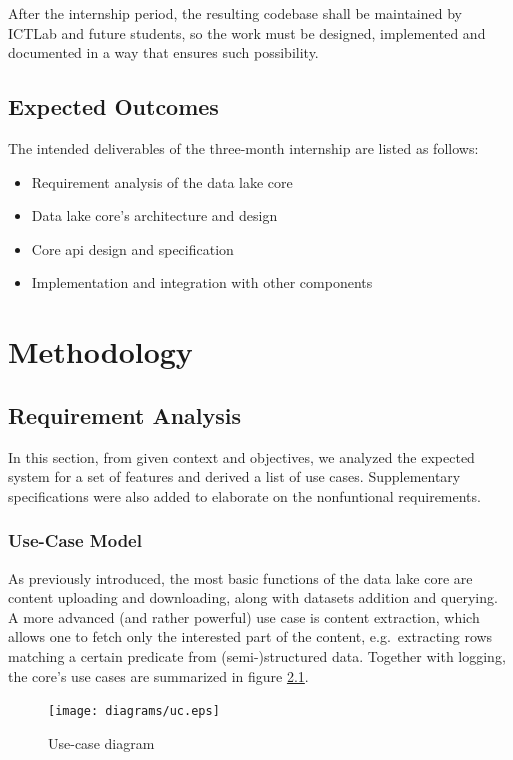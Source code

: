 \documentclass[a4paper,oneside,12pt]{book}
\begin{document}
After the internship period, the resulting codebase shall be maintained
by ICTLab and future students, so the work must be designed, implemented
and documented in a way that ensures such possibility.

\section{Expected Outcomes}
The intended deliverables of the three-month internship are listed as follows:
\begin{itemize}
  \item Requirement analysis of the data lake core
  \item Data lake core's architecture and design
  \item Core \gls{api} design and specification
  \item Implementation and integration with other components
\end{itemize}

\chapter{Methodology}
\section{Requirement Analysis}
In this section, from given context and objectives, we analyzed
the expected system for a set of features and derived a list of use cases.
Supplementary specifications were also added to elaborate
on the nonfuntional requirements.

\subsection{Use-Case Model}
As previously introduced, the most basic functions of the data lake core
are content uploading and downloading, along with datasets addition
and querying.  A more advanced (and rather powerful) use case is
content extraction, which allows one to fetch only the interested part
of the content, e.g.~extracting rows matching a certain \gls{predicate}
from (semi-)structured data.  Together with logging, the core's use cases
are summarized in figure \ref{uc}.

\begin{figure}
  \texttt{[image: diagrams/uc.eps]}
  \caption{Use-case diagram}
  \label{uc}
\end{figure}
\end{document}
